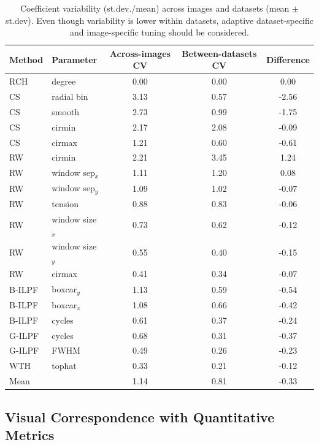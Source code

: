 \documentclass[iucr]{iucrjournals}
\begin{document}
\begin{table}[h]
\centering
\small
\caption{Coefficient variability (st.dev./mean) across images and datasets (mean $\pm$ st.dev). Even though variability is lower within datasets, adaptive dataset-specific and image-specific tuning should be considered.}
\label{tab:summary_total_variability}
\begin{tabular}{llccc}
\toprule
Method & Parameter & Across-images CV & Between-datasets CV & Difference \\
\midrule

RCH & degree & 0.00 & 0.00 & 0.00 \\
CS & radial bin & 3.13 & 0.57 & -2.56 \\
CS & smooth & 2.73 & 0.99 & -1.75 \\
CS & cirmin & 2.17 & 2.08 & -0.09 \\
CS & cirmax & 1.21 & 0.60 & -0.61 \\
RW & cirmin & 2.21 & 3.45 & 1.24 \\
RW & window sep$_x$ & 1.11 & 1.20 & 0.08 \\
RW & window sep$_y$ & 1.09 & 1.02 & -0.07 \\
RW & tension & 0.88 & 0.83 & -0.06 \\
RW & window size$_x$ & 0.73 & 0.62 & -0.12 \\
RW & window size$_y$ & 0.55 & 0.40 & -0.15 \\
RW & cirmax & 0.41 & 0.34 & -0.07 \\
B-ILPF & boxcar$_y$ & 1.13 & 0.59 & -0.54 \\
B-ILPF & boxcar$_x$ & 1.08 & 0.66 & -0.42 \\
B-ILPF & cycles & 0.61 & 0.37 & -0.24 \\
G-ILPF & cycles & 0.68 & 0.31 & -0.37 \\
G-ILPF & FWHM & 0.49 & 0.26 & -0.23 \\
WTH & tophat & 0.33 & 0.21 & -0.12 \\
\midrule
Mean &  & 1.14 & 0.81 & -0.33 \\

\bottomrule
\end{tabular}
\end{table}


\subsection{Visual Correspondence with Quantitative Metrics}
\label{sec:visual_correspondence}
\end{document}
